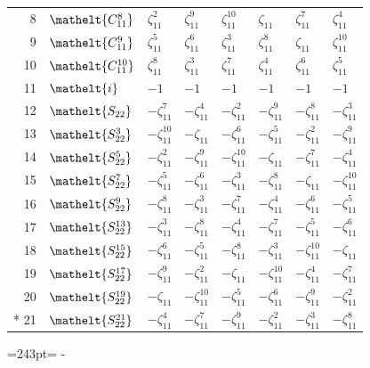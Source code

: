 \documentclass[10pt,a4paper]{article}
\newcommand{\needspace}[1]{\par\penalty-100\begingroup\dimen0=#1\relax\dimen2=\pagegoal
  \advance\dimen2-\pagetotal\ifdim\dimen0>\dimen2\relax\ifdim\dimen2>0pt\vfil\break\fi\fi
  \endgroup}
\numberwithin{equation}{section}
\newcommand{\eltfont}[1]{{\let\sigma\eltsigma\mathelt{#1}}}
\newcommand{\cls}[1]{\eltfont{#1}}
\newcommand{\rootunity}[1]{\zeta_{#1}}
\begin{document}
{\begin{longtable}{@{}rlllllll@{}}
8 & $\cls{C_{11}^{8}}$ & $\rootunity{11}^{2}$ & $\rootunity{11}^{9}$ & $\rootunity{11}^{10}$ & $\rootunity{11}$ & $\rootunity{11}^{7}$ & $\rootunity{11}^{4}$\\
9 & $\cls{C_{11}^{9}}$ & $\rootunity{11}^{5}$ & $\rootunity{11}^{6}$ & $\rootunity{11}^{3}$ & $\rootunity{11}^{8}$ & $\rootunity{11}$ & $\rootunity{11}^{10}$\\
10 & $\cls{C_{11}^{10}}$ & $\rootunity{11}^{8}$ & $\rootunity{11}^{3}$ & $\rootunity{11}^{7}$ & $\rootunity{11}^{4}$ & $\rootunity{11}^{6}$ & $\rootunity{11}^{5}$\\
11 & $\cls{i}$ & $-1$ & $-1$ & $-1$ & $-1$ & $-1$ & $-1$\\
12 & $\cls{S_{22}}$ & $-\rootunity{11}^{7}$ & $-\rootunity{11}^{4}$ & $-\rootunity{11}^{2}$ & $-\rootunity{11}^{9}$ & $-\rootunity{11}^{8}$ & $-\rootunity{11}^{3}$\\
13 & $\cls{S_{22}^{3}}$ & $-\rootunity{11}^{10}$ & $-\rootunity{11}$ & $-\rootunity{11}^{6}$ & $-\rootunity{11}^{5}$ & $-\rootunity{11}^{2}$ & $-\rootunity{11}^{9}$\\
14 & $\cls{S_{22}^{5}}$ & $-\rootunity{11}^{2}$ & $-\rootunity{11}^{9}$ & $-\rootunity{11}^{10}$ & $-\rootunity{11}$ & $-\rootunity{11}^{7}$ & $-\rootunity{11}^{4}$\\
15 & $\cls{S_{22}^{7}}$ & $-\rootunity{11}^{5}$ & $-\rootunity{11}^{6}$ & $-\rootunity{11}^{3}$ & $-\rootunity{11}^{8}$ & $-\rootunity{11}$ & $-\rootunity{11}^{10}$\\
16 & $\cls{S_{22}^{9}}$ & $-\rootunity{11}^{8}$ & $-\rootunity{11}^{3}$ & $-\rootunity{11}^{7}$ & $-\rootunity{11}^{4}$ & $-\rootunity{11}^{6}$ & $-\rootunity{11}^{5}$\\
17 & $\cls{S_{22}^{13}}$ & $-\rootunity{11}^{3}$ & $-\rootunity{11}^{8}$ & $-\rootunity{11}^{4}$ & $-\rootunity{11}^{7}$ & $-\rootunity{11}^{5}$ & $-\rootunity{11}^{6}$\\
18 & $\cls{S_{22}^{15}}$ & $-\rootunity{11}^{6}$ & $-\rootunity{11}^{5}$ & $-\rootunity{11}^{8}$ & $-\rootunity{11}^{3}$ & $-\rootunity{11}^{10}$ & $-\rootunity{11}$\\
19 & $\cls{S_{22}^{17}}$ & $-\rootunity{11}^{9}$ & $-\rootunity{11}^{2}$ & $-\rootunity{11}$ & $-\rootunity{11}^{10}$ & $-\rootunity{11}^{4}$ & $-\rootunity{11}^{7}$\\
20 & $\cls{S_{22}^{19}}$ & $-\rootunity{11}$ & $-\rootunity{11}^{10}$ & $-\rootunity{11}^{5}$ & $-\rootunity{11}^{6}$ & $-\rootunity{11}^{9}$ & $-\rootunity{11}^{2}$\\*
21 & $\cls{S_{22}^{21}}$ & $-\rootunity{11}^{4}$ & $-\rootunity{11}^{7}$ & $-\rootunity{11}^{9}$ & $-\rootunity{11}^{2}$ & $-\rootunity{11}^{3}$ & $-\rootunity{11}^{8}$\\
\bottomrule\end{longtable}}
\needspace{243pt}
\end{document}
